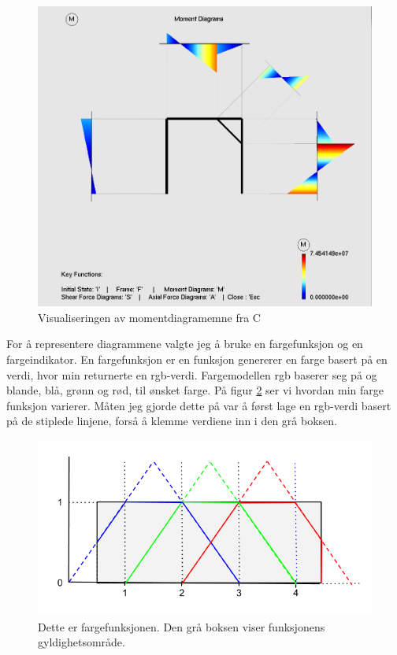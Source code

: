 \documentclass[10pt,a4paper, norsk]{article}
\begin{document}
\begin{figure}[h] 
\centering
\includegraphics[scale=0.26]{momentdiagram.png} 
\caption{Visualiseringen av momentdiagramemne fra C}
\label{fig:momenD}
\end{figure} 


For å representere diagrammene valgte jeg å bruke en fargefunksjon og en fargeindikator. En fargefunksjon er en funksjon genererer en farge basert på en verdi, hvor min returnerte en rgb-verdi. Fargemodellen rgb baserer seg på og blande, blå, grønn og rød, til ønsket farge. På figur \ref{fig:farge} ser vi hvordan min farge funksjon varierer. Måten jeg gjorde dette på var å først lage en rgb-verdi basert på de stiplede linjene, forså å klemme verdiene inn i den grå boksen.

\begin{figure}[h] 
\centering
\includegraphics[scale=0.5]{FargeFunksjon.png}  
\caption{Dette er fargefunksjonen. Den grå boksen viser funksjonens gyldighetsområde. }
\label{fig:farge}
\end{figure} 
\end{document}
